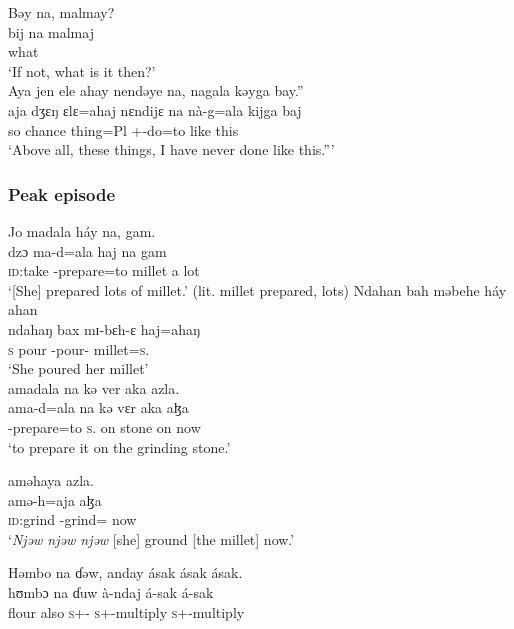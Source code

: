 \medskip
 Bəy  na,  malmay? \\
 \gll bij  na malmaj\\
 {\NEG}        {\PSP}  what\\
 \glt ‘If not, what is it then?’\\
 
 \medskip
  Aya  jen  ele  ahay  nendəye  na, nagala  kəyga  bay.”    \\
 \gll aja   dʒɛŋ  ɛlɛ=ahaj  nɛndijɛ na nà-g=ala  kijga  baj \\
 so  chance  thing=Pl       {\DEM}     {\PSP}  {\oneS}+{\PFV}-do=to  {like this}  {\NEG}           \\
 \glt ‘Above all, these things, I have never done like this.”’\\
 \z
 
\subsubsection*{Peak episode}
 \ea  Jo  madala  háy  na,  gam.  \\
\gll dzɔ    ma-d=ala  haj na gam\\
 \textsc{id}:take  {\NOM}-prepare=to  millet   {\PSP}    {a lot}\\
 \glt ‘[She] prepared lots of millet.' (lit. millet prepared, lots)
 \z
 \ea  Ndahan  bah  məbehe  háy  ahan  \\
\gll ndahaŋ  bax        mɪ-bɛh-ɛ       haj=ahaŋ         \\
 \textsc{s}          pour  {\NOM}{}-pour-{\CL}  millet=\textsc{s}.{\POSS}  \\
 \glt ‘She poured her millet’\\
 
 \medskip
 amadala  na  kə  ver  aka  azla.\\
\gll ama-d=ala     na        kə  vɛr     aka  aɮa\\
 {\DEP}-prepare=to   \textsc{s}.{\DO}  on   stone  on   now\\
 \glt ‘to prepare it on the grinding stone.’
 \z
 
   aməhaya  azla.\\
  amə-h=aja  aɮa\\
 \textsc{id}:grind                        {\DEP}-grind={\PLU}   now\\
 \glt ‘\textit{Njəw  njəw  njəw} [she] ground [the millet] now.’
 \z
 
 \ea  Həmbo  na  ɗəw,  anday  ásak   ásak  ásak.\\
\gll hʊmbɔ  na   ɗuw à-ndaj            á-sak     á-sak\\     
 flour  {\PSP}  also   \textsc{s}+{\PFV}-{\PRG}   \textsc{s}+{\IFV}-multiply  \textsc{s}+{\IFV}-multiply\\ 
 
